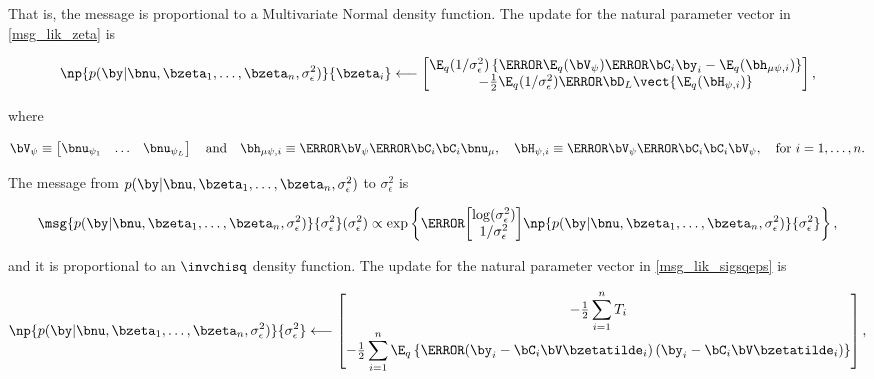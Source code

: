 \documentclass[12pt]{article}
\def\sigsqeps{\sigma^2_{\epsilon}}
\def\numu{\bnu_\mu}
\def\Vpsi{\bV_\psi}
\newcommand\nupsi[1]{\bnu_{\psi_{#1}}}
\newcommand\hmupsi[1]{\bh_{\mu \psi, i}}
\newcommand\Hpsi[1]{\bH_{\psi, i}}
\theoremstyle{plain}
\theoremstyle{definition}
\theoremstyle{remark}
\begin{document}
\noindent That is, the message is proportional to a Multivariate Normal density function.
The update for the natural parameter vector in \eqref{msg_lik_zeta} is

\begin{equation}
	\np{p (\by | \bnu, \bzeta_1, \dots, \bzeta_n, \sigsqeps)}{\bzeta_i}
		\longleftarrow
			\begin{bmatrix}
				\E_q (1/\sigsqeps) \left\{
					\T{\E_q (\Vpsi)} \T{\bC_i} \by_i - \E_q (\hmupsi{i})
				\right\} \\
				-\frac12 \E_q (1/\sigsqeps) \T{\bD_L} \vect \{ \E_q (\Hpsi{i}) \}
			\end{bmatrix},
\label{np_lik_zeta}
\end{equation}

\noindent where

\begin{equation}
	\Vpsi \equiv \begin{bmatrix}
		\nupsi{1} & \dots & \nupsi{L}
	\end{bmatrix} \quad
	\text{and} \quad
	\hmupsi{i} \equiv \T{\Vpsi} \T{\bC_i} \bC_i \numu, \quad
	\Hpsi{i} \equiv \T{\Vpsi} \T{\bC_i} \bC_i \Vpsi, \quad
	\text{for $i = 1, \dots, n$}.
\label{psi_related_defns}
\end{equation}

The message from $p (\by | \bnu, \bzeta_1, \dots, \bzeta_n, \sigsqeps)$ to $\sigsqeps$ is

\begin{equation}
	\msg{p (\by | \bnu, \bzeta_1, \dots, \bzeta_n, \sigsqeps)}{\sigsqeps} (\sigsqeps) \propto
		\exp \left\{
			\T{\begin{bmatrix}
				\log (\sigsqeps) \\
				1/\sigsqeps
			\end{bmatrix}}
			\np{p (\by | \bnu, \bzeta_1, \dots, \bzeta_n, \sigsqeps)}{\sigsqeps}
		\right\},
\label{msg_lik_sigsqeps}
\end{equation}

\noindent and it is proportional to an $\invchisq$ density function. The update for the natural parameter vector in
\eqref{msg_lik_sigsqeps} is

\begin{equation}
	\np{p (\by | \bnu, \bzeta_1, \dots, \bzeta_n, \sigsqeps)}{\sigsqeps}
		\longleftarrow
			\begin{bmatrix}
				-\frac12 \displaystyle\sum_{i=1}^n T_i \\
				-\frac12 \displaystyle\sum_{i=1}^n \E_q \left\{ \T{\left(
					\by_i - \bC_i \bV \bzetatilde_i
				\right)} \left(
					\by_i - \bC_i \bV \bzetatilde_i
				\right) \right\}
			\end{bmatrix},
\label{np_lik_sigsqeps}
\end{equation}
\end{document}
